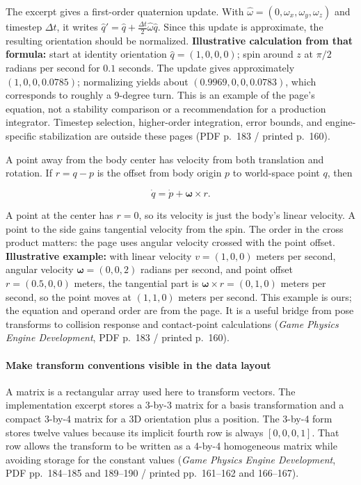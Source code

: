 The excerpt gives a first-order quaternion update. With \(\hat{\omega}=(0,\omega_x,\omega_y,\omega_z)\) and timestep \(\Delta t\), it writes \(\hat q' = \hat q + \frac{\Delta t}{2}\hat{\omega}\hat q\). Since this update is approximate, the resulting orientation should be normalized. \textbf{Illustrative calculation from that formula:} start at identity orientation \(\hat q=(1,0,0,0)\); spin around \(z\) at \(\pi/2\) radians per second for \(0.1\) seconds. The update gives approximately \((1,0,0,0.0785)\); normalizing yields about \((0.9969,0,0,0.0783)\), which corresponds to roughly a 9-degree turn. This is an example of the page's equation, not a stability comparison or a recommendation for a production integrator. Timestep selection, higher-order integration, error bounds, and engine-specific stabilization are outside these pages (PDF p.~183 / printed p.~160).

A point away from the body center has velocity from both translation and rotation. If \(r=q-p\) is the offset from body origin \(p\) to world-space point \(q\), then

\[
\dot q = \dot p + \boldsymbol{\omega} \times r.
\]

A point at the center has \(r=0\), so its velocity is just the body's linear velocity. A point to the side gains tangential velocity from the spin. The order in the cross product matters: the page uses angular velocity crossed with the point offset. \textbf{Illustrative example:} with linear velocity \(v=(1,0,0)\) meters per second, angular velocity \(\boldsymbol{\omega}=(0,0,2)\) radians per second, and point offset \(r=(0.5,0,0)\) meters, the tangential part is \(\boldsymbol{\omega}\times r=(0,1,0)\) meters per second, so the point moves at \((1,1,0)\) meters per second. This example is ours; the equation and operand order are from the page. It is a useful bridge from pose transforms to collision response and contact-point calculations (\emph{Game Physics Engine Development}, PDF p.~183 / printed p.~160).

\paragraph{Make transform conventions visible in the data layout}\label{06-engine-ii-ch025-make-transform-conventions-visible-in-the-data-layout}

\hypertarget{06-engine-ii-ch025-make-transform-conventions-visible-in-the-data-layout}{}

A matrix is a rectangular array used here to transform vectors. The implementation excerpt stores a 3-by-3 matrix for a basis transformation and a compact 3-by-4 matrix for a 3D orientation plus a position. The 3-by-4 form stores twelve values because its implicit fourth row is always \([0,0,0,1]\). That row allows the transform to be written as a 4-by-4 homogeneous matrix while avoiding storage for the constant values (\emph{Game Physics Engine Development}, PDF pp.~184--185 and 189--190 / printed pp.~161--162 and 166--167).

